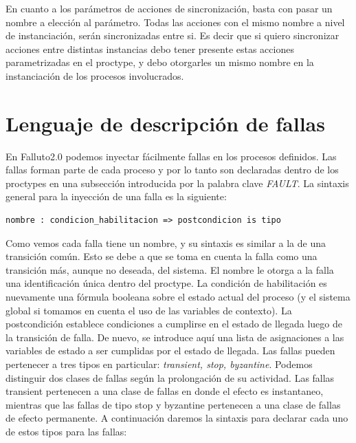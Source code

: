 \documentclass[titlepage, 12pt]{book}
\begin{document}
En cuanto a los par\'ametros de acciones de sincronizaci\'on, basta con pasar un nombre a elecci\'on al par\'ametro. Todas las acciones con el mismo nombre a nivel de instanciaci\'on, ser\'an sincronizadas entre si. Es decir que si quiero sincronizar acciones entre distintas instancias debo tener presente estas acciones parametrizadas en el proctype, y debo otorgarles un mismo nombre en la instanciaci\'on de los procesos involucrados.

\section{Lenguaje de descripci\'on de fallas}
En Falluto2.0 podemos inyectar f\'acilmente fallas en los procesos definidos. Las fallas forman parte de cada proceso y por lo tanto son declaradas dentro de los proctypes en una subsecci\'on introducida por la palabra clave \textit{FAULT}. La sintaxis general para la inyecci\'on de una falla es la siguiente: \begin{verbatim}nombre : condicion_habilitacion => postcondicion is tipo\end{verbatim}
Como vemos cada falla tiene un nombre, y su sintaxis es similar a la de una transici\'on com\'un. Esto se debe a que se toma en cuenta la falla como una transici\'on m\'as, aunque no deseada, del sistema. El nombre le otorga a la falla una identificaci\'on \'unica dentro del proctype. La condici\'on de habilitaci\'on es nuevamente una f\'ormula booleana sobre el estado actual del proceso (y el sistema global si tomamos en cuenta el uso de las variables de contexto). La postcondici\'on establece condiciones a cumplirse en el estado de llegada luego de la transici\'on de falla. De nuevo, se introduce aqu\'i una lista de asignaciones a las variables de estado a ser cumplidas por el estado de llegada. Las fallas pueden pertenecer a tres tipos en particular: \textit{transient, stop, byzantine}. Podemos distinguir dos clases de fallas seg\'un la prolongaci\'on de su actividad. Las fallas transient pertenecen a una clase de fallas en donde el efecto es instantaneo, mientras que las fallas de tipo stop y byzantine pertenecen a una clase de fallas de efecto permanente. A continuaci\'on daremos la sintaxis para declarar cada uno de estos tipos para las fallas:\\
\end{document}
